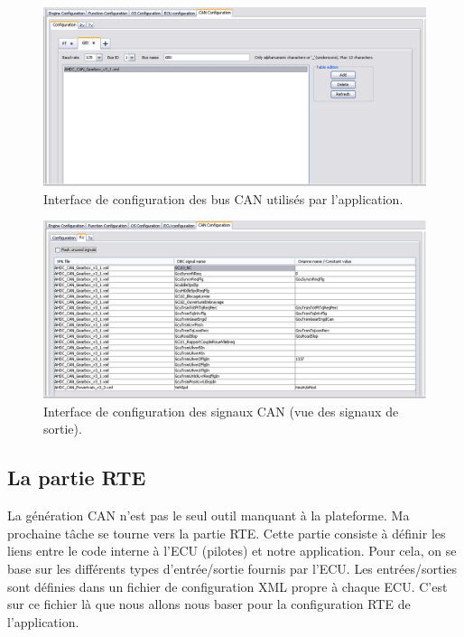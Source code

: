 \begin{figure}[h]
 \centering
 \centerline{\includegraphics[scale=0.47]{images/ihmcan_conf}}
 \caption{Interface de configuration des bus CAN utilisés par l'application.}
 \label{fig:ihmcan_conf}
\end{figure}

\begin{figure}[h]
  \centering
  \centerline{\includegraphics[scale=0.47]{images/ihmcan_signal}}
  \caption{Interface de configuration des signaux CAN (vue des signaux de
  sortie).}
  \label{fig:ihmcan_signal}
\end{figure}


\subsection{La partie RTE}
La génération CAN n'est pas le seul outil manquant à la plateforme. Ma
prochaine tâche se tourne vers la partie RTE. Cette partie consiste à définir
les liens entre le code interne à l'ECU (pilotes) et notre application. Pour
cela, on se base sur les différents types d'entrée/sortie fournis par l'ECU. Les
entrées/sorties sont définies dans un fichier de configuration XML propre à
chaque ECU. C'est sur ce fichier là que nous allons nous baser pour la
configuration RTE de l'application.

